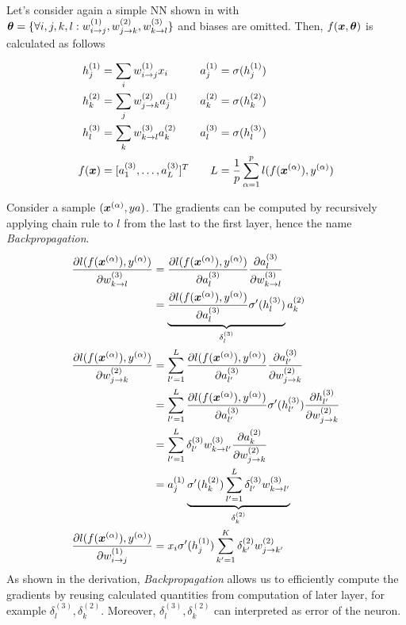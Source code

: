Let's consider again a simple NN shown in \addfigure{\ref{fig:nn_typical_structure}} with $\boldsymbol{\theta} = \{ \forall i,j,k,l : w^{(1)}_{i \rightarrow j}, w^{(2)}_{j \rightarrow k}, w^{(3)}_{k \rightarrow l}  \}$ and biases are omitted. Then, $f(\boldsymbol{x}, \boldsymbol{\theta})$ is calculated as follows

\begin{align*}
		h_j^{(1)} &= \sum_i w_{i \rightarrow j}^{(1)} x_i & a_j^{(1)} &= \sigma (h_j^{(1)})	\\
		h_k^{(2)} &= \sum_j w_{j \rightarrow k}^{(2)} a_j^{(1)}  & a_k^{(2)} &= \sigma (h_k^{(2)})	 \\
		h_l^{(3)} &= \sum_k w_{k \rightarrow l}^{(3)} a_k^{(2)} & a_l^{(3)} &= \sigma (h_l^{(3)})	 \\
		f(\x) &= [ a_1^{(3)}, \dots, a_L^{(3)}  ]^T  & L &= \frac{1}{p} \sum_{\alpha = 1}^{p} l(f(\xa), \ya)	
\end{align*}

Consider a sample $(\xa, ya)$. The gradients can be computed by recursively applying chain rule to $l$ from the last to the first layer, hence the name \textit{Backpropagation}.
\begin{align}
	\frac{\partial l(f(\xa), \ya)  }{\partial w_{k \rightarrow l}^{(3)} } &= 	\frac{\partial l(f(\xa), \ya) }{\partial a_{l}^{(3)} }  \frac{\partial a_{l}^{(3)} }{\partial w_{k \rightarrow l}^{(3)} }  	\\
		&= 	\underbrace{\frac{\partial l(f(\xa), \ya) }{\partial a_{l}^{(3)} } \sigma'(h_l^{(3)})}_{ \delta_l^{(3)}} a_{k}^{(2)} 	\\
	\frac{\partial l(f(\xa), \ya)  }{\partial w_{j \rightarrow k}^{(2)} } 
		&=  \sum_{l' = 1}^{L} 	\frac{\partial l(f(\xa), \ya) }{\partial a_{l'}^{(3)} } \frac{\partial a_{l'}^{(3)}}{\partial w_{j \rightarrow k}^{(2)}} \\
		&= \sum_{l' = 1}^{L} 	\frac{\partial l(f(\xa), \ya) }{\partial a_{l'}^{(3)} } \sigma'(h_{l'}^{(3)})  \frac{\partial h_{l'}^{(3)} }{\partial w_{j \rightarrow k}^{(2)}} \\
		&= \sum_{l' = 1}^{L} 	\delta_{l'}^{(3)}  w_{k \rightarrow l'}^{(3)} \frac{\partial a_{k}^{(2)} }{\partial w_{j \rightarrow k}^{(2)}} \\
		&= a_{j}^{(1)}  \underbrace{\sigma'(h_{k}^{(2)}) \sum_{l' = 1}^{L} 	\delta_{l'}^{(3)} w_{k \rightarrow l'}^{(3)}}_{\delta_{k}^{(2)}}  \\
	\frac{\partial l(f(\xa), \ya)  }{\partial w_{i \rightarrow j}^{(1)} } &=  x_i  \sigma'(h_{j}^{(1)}) \sum_{k' = 1}^{K} 	\delta_{k'}^{(2)} w_{j \rightarrow k'}^{(2)} 
\end{align}
As shown in the derivation, \textit{Backpropagation} allows us to efficiently compute the gradients by reusing calculated quantities from computation of later layer, for example $\delta_l^{(3)}, 	\delta_{k}^{(2)}$. Moreover, $\delta_l^{(3)}, 	\delta_{k}^{(2)}$ can interpreted as error of the neuron. 

